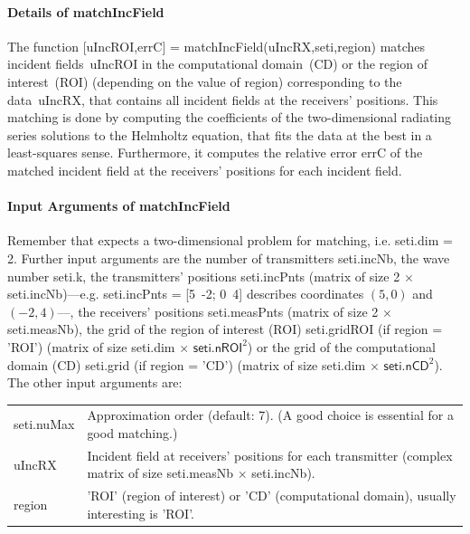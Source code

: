 \documentclass[a4paper]{article}
\begin{document}
\paragraph{Details of \textsf{matchIncField}} The function \textsf{[uIncROI,errC] = matchIncField(uIncRX,seti,region)} matches incident fields~\textsf{uIncROI} in the computational domain~(CD) or the region of interest~(ROI) (depending on the value of \textsf{region}) corresponding to the data~\textsf{uIncRX}, that contains all incident fields at the receivers' positions. This matching is done by computing the coefficients of the two-dimensional radiating series solutions to the Helmholtz equation, that fits the data at the best in a least-squares sense. Furthermore, it computes the relative error \textsf{errC} of the matched incident field at the receivers' positions for each incident field.

\paragraph{Input Arguments of \textsf{matchIncField}} Remember that \IPscatt expects a two-dimensional problem for matching, i.e. \textsf{seti.dim = 2}. 
Further input arguments are the number of transmitters \textsf{seti.incNb}, the wave number \textsf{seti.k}, the transmitters' positions \textsf{seti.incPnts} (matrix of size 2 $\times$ \textsf{seti.incNb})---e.g. \textsf{seti.incPnts = [5~-2; 0~4]} describes coordinates $(5,0)$ and $(-2,4)$---, the receivers' positions \textsf{seti.measPnts} (matrix of size 2 $\times$ \textsf{seti.measNb}), the grid of the region of interest (ROI) \textsf{seti.gridROI} (if \textsf{region = 'ROI'}) (matrix of size \textsf{seti.dim} $\times$ $\textsf{seti.nROI}^2$) or the grid of the computational domain (CD) \textsf{seti.grid} (if \textsf{region = 'CD'}) (matrix of size \textsf{seti.dim} $\times$ $\textsf{seti.nCD}^2$). The other input arguments are:

\noindent\begin{tabular}[t]{p{2cm} p{13.6cm}}
 \textsf{seti.nuMax} & Approximation order (default: 7). (A good choice is essential for a good matching.)\\
 \textsf{uIncRX} & Incident field at receivers' positions for each transmitter (complex matrix of size \textsf{seti.measNb} $\times$ \textsf{seti.incNb}).\\
 \textsf{region} & \textsf{'ROI'} (region of interest) or \textsf{'CD'} (computational domain), usually interesting is \textsf{'ROI'}.
\end{tabular}
\end{document}
